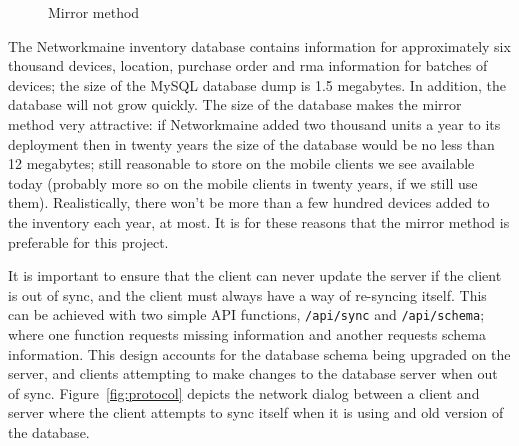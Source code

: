 \begin{figure}[h!]
\centering
{}
\caption{Mirror method}
\label{fig:mirror}
\end{figure}

The Networkmaine inventory database contains information for approximately six
thousand devices, location, purchase order and rma information for batches of
devices; the size of the MySQL database dump is 1.5 megabytes. In addition, the
database will not grow quickly. The size of the database makes the mirror method
very attractive: if Networkmaine added two thousand units a year to its
deployment then in twenty years the size of the database would be no less than
12 megabytes; still reasonable to store on the mobile clients we see available
today (probably more so on the mobile clients in twenty years, if we still use
them). Realistically, there won't be more than a few hundred devices added to
the inventory each year, at most. It is for these reasons that the mirror method
is preferable for this project. 







It is important to ensure that the client can never update the server if the
client is out of sync, and the client must always have a way of re-syncing
itself.  This can be achieved with two simple API functions, \texttt{/api/sync}
and \texttt{/api/schema}; where one function requests missing information and
another requests schema information. This design accounts for the database
schema being upgraded on the server, and clients attempting to make changes to
the database server when out of sync. Figure~\ref{fig:protocol} depicts the
network dialog between a client and server where the client attempts to sync
itself when it is using and old version of the database. 




